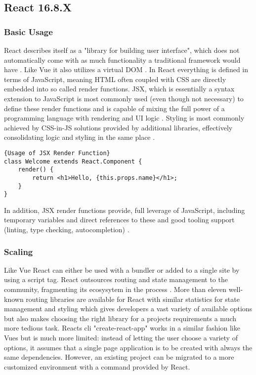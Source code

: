 
\subsection{React 16.8.X}

\subsubsection{Basic Usage}
React describes itself as a "library for building user interface", which does not automatically come with as much functionality a traditional framework would have \cite[p.~2]{LearningReactBanks:book}. Like Vue it also utilizes a virtual DOM \cite[p.~81]{LearningReactBanks:book}. In React everything is defined in terms of JavaScript, meaning HTML often coupled with CSS are directly embedded into so called render functions. JSX, which is essentially a syntax extension to JavaScript \cite{ReactJSX:online} is most commonly used (even though not necessary) to define these render functions and is capable of mixing the full power of a programming language with rendering and UI logic \cite{ComparisonVue:online}. Styling is most commonly achieved by CSS-in-JS solutions provided by additional libraries, effectively consolidating logic and styling in the same place \cite{islam2017reactjs:article}. \newline

\begin{lstlisting}[caption=Usage of JSX Render Function, captionpos=b, style=htmlcssjs]{Usage of JSX Render Function}
class Welcome extends React.Component {
    render() {
        return <h1>Hello, {this.props.name}</h1>;
    }
}
\end{lstlisting}

In addition, JSX render functions provide, full leverage of JavaScript, including temporary variables and direct references to these and good tooling support (linting, type checking, autocompletion) \cite{ComparisonVue:online, ReactJSX:online}.

\subsubsection{Scaling}
Like Vue React can either be used with a bundler or added to a single site by using a script tag. React outsources routing and state management to the community, fragmenting its ecosysytem in the process \cite{ComparisonVue:online}. More than eleven well-known routing libraries are available for React with similar statistics for state management and styling which gives developers a vast variety of available options but also makes choosing the right library for a projects requirements a much more tedious task. Reacts cli "create-react-app" works in a similar fashion like Vues but is much more limited: instead of letting the user choose a variety of options, it assumes that a single page application is to be created with always the same dependencies. However, an existing project can be migrated to a more customized environment with a command provided by React.

